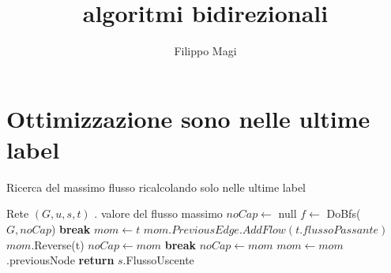 \documentclass{article}
\title{algoritmi bidirezionali}
\author{Filippo Magi }
\begin{document}
\maketitle

\section{Ottimizzazione sono nelle ultime label}
\begin{algorithm}
\caption{Ricerca del massimo flusso ricalcolando solo nelle ultime label}
\begin{algorithmic}
\REQUIRE Rete $(G,u,s,t)$ .
\ENSURE valore del flusso massimo
\STATE $noCap \leftarrow$ null
\STATE $f \leftarrow$ DoBfs($G,noCap$)
\STATE \textbf{break}
\ENDIF
\STATE $mom \leftarrow t$
\STATE $mom.PreviousEdge.AddFlow(t.flussoPassante)$
\STATE $mom$.Reverse(t) 
\STATE $noCap \leftarrow mom$
\STATE \textbf{break}
\ENDIF
{}
\STATE $noCap \leftarrow mom$
\ENDIF
\STATE $mom \leftarrow mom$.previousNode
\ENDWHILE
\ENDWHILE
\STATE \textbf{return} $s$.FlussoUscente
\end{algorithmic}
\end{algorithm}
\end{document}
